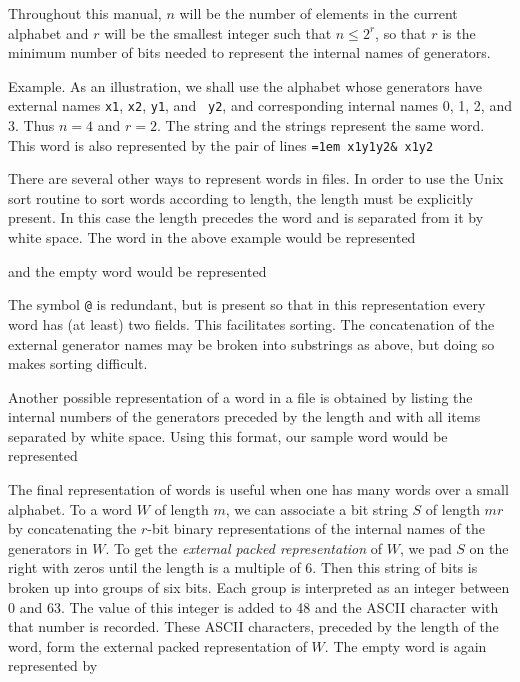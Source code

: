 Throughout this manual, $n$ will be the number of elements in the
current alphabet and $r$ will be the smallest integer such that $n \le
2^r$, so that $r$ is the minimum number of bits needed to represent
the internal names of generators.

\smallskip
Example. As an illustration, we shall use the alphabet whose
generators have external names {\tt x1}, {\tt x2}, {\tt y1}, and {\tt
y2}, and corresponding internal names 0, 1, 2, and 3.  Thus $n = 4$
and $r = 2$. The string
\medskip
\noindent{}
\medskip
\noindent and the strings
\medskip
\noindent{}
\medskip
\noindent represent the same word. This word is also represented by the pair of
lines
\medskip
{\obeylines \tt \parindent=1em
x1y1y2\&
x1y2
}

\medskip

There are several other ways to represent words in files. In order to
use the Unix sort routine to sort words according to length, the
length must be explicitly present. In this case the length precedes
the word and is separated from it by white space. The word in the
above example would be represented

\medskip
\noindent{}
\medskip
\noindent and the empty word would be represented
\medskip
\noindent{}
\medskip

\noindent The symbol {\tt @} is redundant, but is present so that in this
representation every word has (at least) two fields. This facilitates
sorting. The concatenation of the external generator names may be
broken into substrings as above, but doing so makes sorting difficult.

Another possible representation of a word in a file is obtained by
listing the internal numbers of the generators preceded by the length
and with all items separated by white space.  Using this format, our
sample word would be represented

\medskip
\noindent{}
\medskip

The final representation of words is useful when one has many words
over a small alphabet. To a word $W$ of length $m$, we can associate a
bit string $S$ of length $mr$ by concatenating the $r$-bit binary
representations of the internal names of the generators in $W$.  To
get the {\it external packed representation\/} of $W$,
we pad $S$ on the right with zeros until the length is a multiple of 6.
Then this string of bits is broken up into groups of six bits. Each
group is interpreted as an integer between 0 and 63. The value of this
integer is added to 48 and the ASCII character with that number is
recorded.  These ASCII characters, preceded by the length of the word,
form the external packed representation of $W$. The empty word is again
represented by

